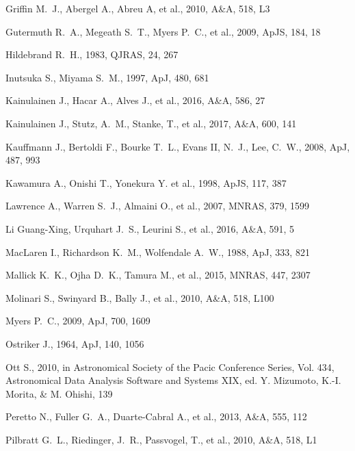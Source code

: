 \documentclass[iop]{emulateapj}
\begin{document}
\begin{thebibliography}{}
Griffin M.~J., Abergel A., Abreu A, et al., 2010, A\&A, 518, L3

Gutermuth R.~A., Megeath S.~T., Myers P.~C., et al., 2009, ApJS, 184, 18

Hildebrand R.~H., 1983, QJRAS, 24, 267

Inutsuka S., Miyama S.~M., 1997, ApJ, 480, 681

Kainulainen J., Hacar A.,  Alves J., et al., 2016, A\&A, 586, 27

Kainulainen J., Stutz, A.~M., Stanke, T., et al., 2017, A\&A, 600, 141

Kauffmann J., Bertoldi F., Bourke T.~L., Evans II, N.~J., Lee, C.~W., 2008, ApJ, 487, 993

Kawamura A., Onishi T., Yonekura Y. et al., 1998, ApJS, 117, 387

Lawrence A., Warren S.~J., Almaini O., et al., 2007, MNRAS, 379, 1599

Li Guang-Xing, Urquhart J.~S., Leurini S., et al., 2016, A\&A, 591, 5

MacLaren I., Richardson K.~M., Wolfendale A.~W., 1988, ApJ, 333, 821

Mallick K.~K., Ojha D.~K., Tamura M., et al., 2015, MNRAS, 447, 2307

Molinari S., Swinyard B., Bally J., et al., 2010, A\&A, 518, L100

Myers P.~C., 2009, ApJ, 700, 1609

Ostriker J., 1964, ApJ, 140, 1056

Ott S., 2010, in Astronomical Society of the Pacic Conference
Series, Vol. 434, Astronomical Data Analysis Software and
Systems XIX, ed. Y. Mizumoto, K.-I. Morita, \& M. Ohishi, 139

Peretto N., Fuller G.~A., Duarte-Cabral A., et al., 2013, A\&A, 555, 112

Pilbratt G.~L., Riedinger, J.~R., Passvogel, T., et al., 2010, A\&A, 518, L1


\end{thebibliography}
\end{document}
